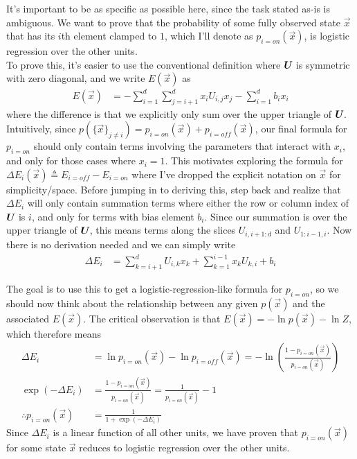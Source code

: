 \documentclass[11pt]{article}
\begin{document}
\begin{example}
	\tiny
	It's important to be as specific as possible here, since the task stated as-is is ambiguous. We want to prove that the probability of some fully observed state $\vec x$ that has its $i$th element clamped to $1$, which I'll denote as $p_{i=on}(\vec x)$, is logistic regression over the other units.\\
	
	To prove this, it's easier to use the conventional definition where $\bm{U}_{}$ is symmetric with zero diagonal, and we write $E(\vec x)$ as
	\begin{align}
		E(\vec x)
			&= - \sum_{i=1}^{d} \sum_{j=i+1}^{d} x_i U_{i,j} x_j - \sum_{i=1}^{d} b_i x_i
	\end{align}
	where the difference is that we explicitly only sum over the upper triangle of $\bm{U}_{}$. \\
	
	Intuitively, since $p(\{ \vec x \}_{j \ne i}) = p_{i=on}(\vec x) + p_{i=off}(\vec x)$, our final formula for $p_{i=on}$ should only contain terms involving the parameters that interact with $x_i$, and only for those cases where $x_i=1$. This motivates exploring the formula for $\Delta E_i (\vec x) \triangleq E_{i=off} - E_{i=on}$ where I've dropped the explicit notation on $\vec x$ for simplicity/space. Before jumping in to deriving this, step back and realize that $\Delta E_i$ will only contain summation terms where either the row or column index of $\bm{U}_{}$ is $i$, and only for terms with bias element $b_i$. Since our summation is over the upper triangle of $\bm{U}_{}$, this means terms along the slices $U_{i, i+1:d}$ and $U_{1:i-1, i}$. Now there is no derivation needed and we can simply write
	\begin{align}
		\Delta E_i 
			&= \sum_{k = i + 1}^{d} U_{i, k} x_k + \sum_{k = 1}^{i-1} x_k U_{k, i} + b_i 
	\end{align}
	
	The goal is to use this to get a logistic-regression-like formula for $p_{i=on}$, so we should now think about the relationship between any given $p(\vec x)$ and the associated $E(\vec x)$. The critical observation is that $E(\vec x) = -\ln p(\vec x) - \ln Z$, which therefore means
	\begin{align}
		\Delta E_i
			&= \ln p_{i=on}(\vec x) - \ln p_{i=off}(\vec x)
			= - \ln\left( \frac{ 1 - p_{i=on}(\vec x)  }{p_{i=on}(\vec x)}  \right) \\
		\exp(- \Delta E_i)
			&=  \frac{ 1 - p_{i=on}(\vec x)  }{p_{i=on}(\vec x)} =  \frac{ 1 }{p_{i=on}(\vec x)} - 1 \\
		\therefore p_{i=on}(\vec x)
			&= \frac{ 1 }{ 1 +  \exp(- \Delta E_i) }
	\end{align}
	Since $\Delta E_i$ is a linear function of all other units, we have proven that $p_{i=on}(\vec x)$ for some state $\vec x$ reduces to logistic regression over the other units. 
\end{example}
\end{document}
